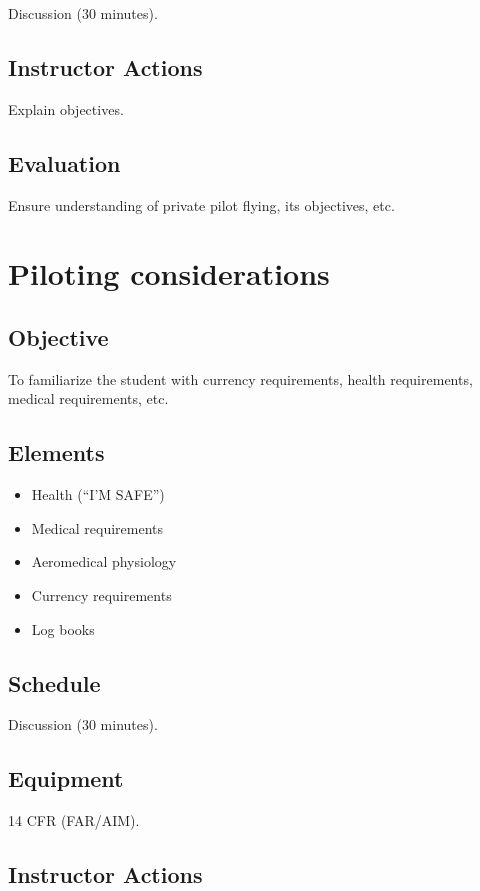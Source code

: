 \documentclass[twoside,openright]{report}
\begin{document}
Discussion (30 minutes).

\section{Instructor Actions}

Explain objectives.

\section{Evaluation}

Ensure understanding of private pilot flying, its objectives, etc.

\chapter{Piloting considerations}

\section{Objective}

To familiarize the student with currency requirements, health requirements,
medical requirements, etc.

\section{Elements}

\begin{itemize}
  \item Health (``I'M SAFE'')
  \item Medical requirements
  \item Aeromedical physiology
  \item Currency requirements
  \item Log books
\end{itemize}

\section{Schedule}

Discussion (30 minutes).

\section{Equipment}

14 CFR (FAR/AIM).

\section{Instructor Actions}
\end{document}
